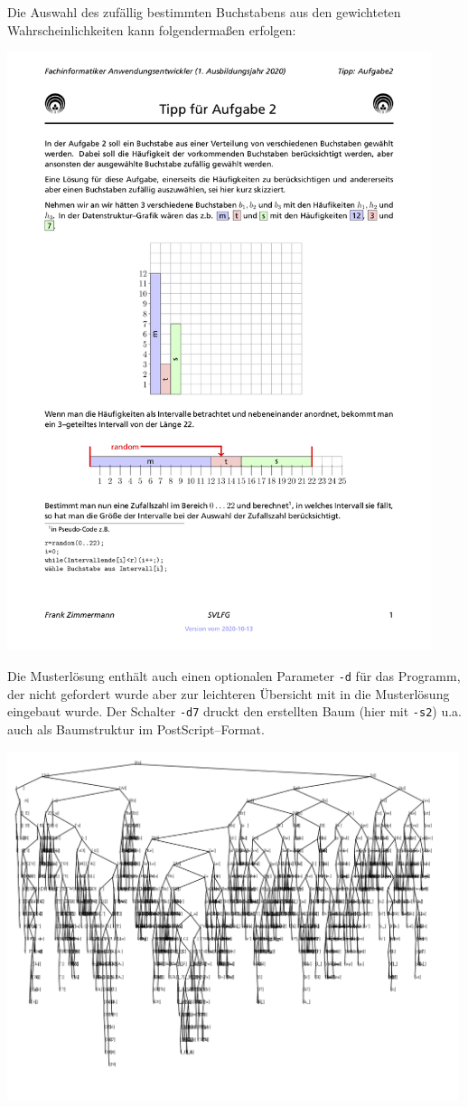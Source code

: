 \documentclass[paper=a4,notitlepage,parskip=half,plainheadsepline]{scrartcl}
\begin{document}
\newpage
Die Auswahl des zufällig bestimmten Buchstabens aus den gewichteten Wahrscheinlichkeiten kann folgendermaßen erfolgen:
\begin{center}
\includegraphics[width=0.93\textwidth]{TippWahrscheinlichkeiten.png}
\end{center}
\newpage
Die Musterlösung enthält auch einen optionalen Parameter \texttt{-d} für das Programm, der nicht gefordert wurde aber zur leichteren Übersicht mit in die Musterlösung eingebaut wurde. Der Schalter \texttt{-d7} druckt den erstellten Baum (hier mit \texttt{-s2}) u.a. auch als Baumstruktur im PostScript--Format. 
\begin{center}
\includegraphics[width=0.99\textwidth]{shakespeareBaum2.png}
\end{center}
\newpage
{}

\fi
\end{document}
